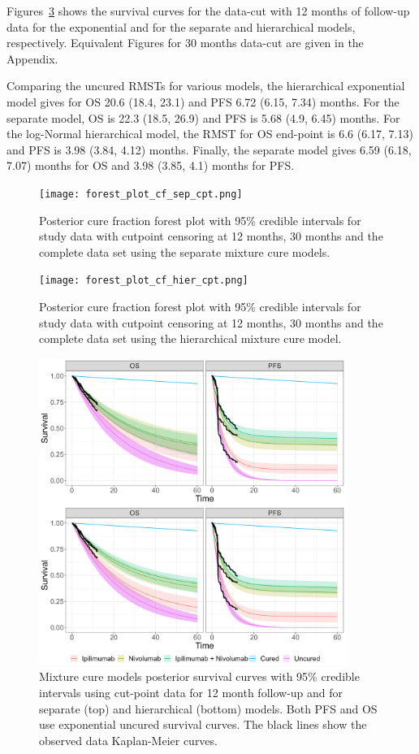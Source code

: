 \documentclass[AMA,STIX1COL]{WileyNJD-v2}
\begin{document}
Figures~\ref{fig:S_cutpoint_12mo_exp} shows the survival curves for the data-cut with 12 months of follow-up data for the exponential and for the separate and hierarchical models, respectively.
Equivalent Figures for 30 months data-cut are given in the Appendix.

Comparing the uncured RMSTs for various models,
the hierarchical exponential model gives for OS 20.6 (18.4, 23.1) and PFS 6.72 (6.15, 7.34) months.
For the separate model, OS is 22.3 (18.5, 26.9) and PFS is 5.68 (4.9, 6.45) months.
For the log-Normal hierarchical model, the RMST for OS end-point is 6.6 (6.17, 7.13) and PFS is 3.98 (3.84, 4.12) months.
Finally, the separate model gives 6.59 (6.18, 7.07) months for OS and 3.98 (3.85, 4.1) months for PFS.


\begin{figure}[!ht]
\centering
\texttt{[image: forest\_plot\_cf\_sep\_cpt.png]}
\caption{\label{fig:forest_plot_cf_cutpoint_sep} Posterior cure fraction forest plot with 95\% credible intervals for study data with cutpoint censoring at 12 months, 30 months and the complete data set using the separate mixture cure models.}
\end{figure}

\begin{figure}[!ht]
\centering
\texttt{[image: forest\_plot\_cf\_hier\_cpt.png]}
\caption{\label{fig:forest_plot_cf_cutpoint_hier} Posterior cure fraction forest plot with 95\% credible intervals for study data with cutpoint censoring at 12 months, 30 months and the complete data set using the hierarchical mixture cure model.}
\end{figure}

\begin{figure}[!ht]
\centering
\includegraphics[height=10cm, width=0.6\linewidth]{plot_S_grid_cf_exponential_cpt_12.png}
\caption{\label{fig:S_cutpoint_12mo_exp} Mixture cure models posterior survival curves with 95\% credible intervals using cut-point data for 12 month follow-up and for separate (top) and hierarchical (bottom) models. Both PFS and OS use exponential uncured survival curves. The black lines show the observed data Kaplan-Meier curves.}
\end{figure}
\end{document}
